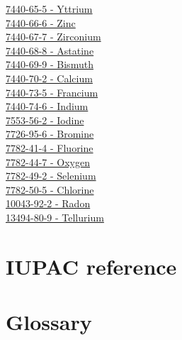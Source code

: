 \documentclass{book}
\begin{document}
\begin{multicols}{2}
\hyperref[sec:elem-yttrium]{7440-65-5 - Yttrium}\\
\hyperref[sec:elem-zinc]{7440-66-6 - Zinc}\\
\hyperref[sec:elem-zirconium]{7440-67-7 - Zirconium}\\
\hyperref[sec:elem-astatine]{7440-68-8 - Astatine}\\
\hyperref[sec:elem-bismuth]{7440-69-9 - Bismuth}\\
\hyperref[sec:elem-calcium]{7440-70-2 - Calcium}\\
\hyperref[sec:elem-francium]{7440-73-5 - Francium}\\
\hyperref[sec:elem-indium]{7440-74-6 - Indium}\\
\hyperref[sec:elem-iodine]{7553-56-2 - Iodine}\\
\hyperref[sec:elem-bromine]{7726-95-6 - Bromine}\\
\hyperref[sec:elem-fluorine]{7782-41-4 - Fluorine}\\
\hyperref[sec:elem-oxygen]{7782-44-7 - Oxygen}\\
\hyperref[sec:elem-selenium]{7782-49-2 - Selenium}\\
\hyperref[sec:elem-chlorine]{7782-50-5 - Chlorine}\\
\hyperref[sec:elem-radon]{10043-92-2 - Radon}\\
\hyperref[sec:elem-tellurium]{13494-80-9 - Tellurium}\\
\end{multicols}

\chapter{IUPAC reference}

\chapter{Glossary}
\end{document}
